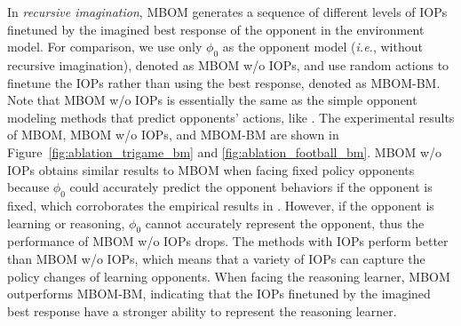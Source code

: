 \documentclass{article}
\begin{document}
In \textit{recursive imagination}, MBOM generates a sequence of different levels of IOPs finetuned by the imagined best response of the opponent in the environment model. For comparison, we use only $\phi_0$ as the opponent model (\textit{i.e.}, without recursive imagination), denoted as MBOM w/o IOPs, and use random actions to finetune the IOPs rather than using the best response, denoted as MBOM-BM. 
Note that MBOM w/o IOPs is essentially the same as the simple opponent modeling methods that predict opponents' actions, like \citep{he2016opponent,hong2018deep,grover2018learning}.
The experimental results of MBOM, MBOM w/o IOPs, and MBOM-BM are shown in Figure~\ref{fig:ablation_trigame_bm} and \ref{fig:ablation_football_bm}. MBOM w/o IOPs obtains similar results to MBOM when facing fixed policy opponents because $\phi_0$ could accurately predict the opponent behaviors if the opponent is fixed, which corroborates the empirical results in \citep{he2016opponent,hong2018deep,grover2018learning}. However, if the opponent is learning or reasoning, $\phi_0$ cannot accurately represent the opponent, thus the performance of MBOM w/o IOPs drops. The methods with IOPs perform better than MBOM w/o IOPs, which means that a variety of IOPs can capture the policy changes of learning opponents. When facing the reasoning learner, MBOM outperforms MBOM-BM, indicating that the IOPs finetuned by the imagined best response have a stronger ability to represent the reasoning learner.

\end{document}
